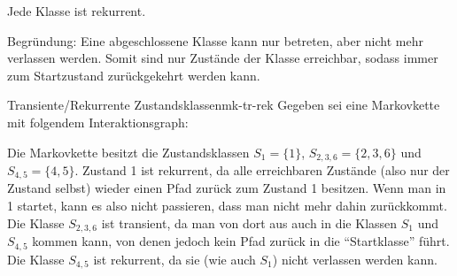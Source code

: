 \begin{lemma}
Jede  Klasse ist rekurrent.

Begründung: Eine abgeschlossene Klasse kann nur betreten, aber nicht mehr
verlassen werden. Somit sind nur Zustände der Klasse erreichbar, sodass immer
zum Startzustand zurückgekehrt werden kann.
\end{lemma}

\begin{example}{Transiente/Rekurrente Zustandsklassen}{mk-tr-rek}
Gegeben sei eine Markovkette mit folgendem Interaktionsgraph:


Die Markovkette besitzt die Zustandsklassen $S_{1}=\{1\}$, $S_{2,3,6} =\{2,3,6\}$
und $S_{4,5}=\{4, 5\}$. Zustand 1 ist rekurrent, da alle erreichbaren Zustände
(also nur der Zustand selbst) wieder einen Pfad zurück zum Zustand 1 besitzen.
Wenn man in 1 startet, kann es also nicht passieren, dass man nicht mehr dahin
zurückkommt.
Die Klasse $S_{2,3,6}$ ist transient, da man von dort aus auch in die Klassen
$S_1$ und $S_{4,5}$ kommen kann, von denen jedoch kein Pfad zurück in die
"`Startklasse"' führt. Die Klasse $S_{4,5}$ ist rekurrent, da sie (wie auch
$S_1$) nicht verlassen werden kann.
\end{example}
